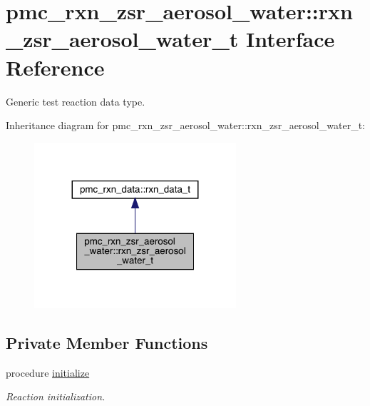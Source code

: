 \hypertarget{structpmc__rxn__zsr__aerosol__water_1_1rxn__zsr__aerosol__water__t}{}\section{pmc\+\_\+rxn\+\_\+zsr\+\_\+aerosol\+\_\+water\+:\+:rxn\+\_\+zsr\+\_\+aerosol\+\_\+water\+\_\+t Interface Reference}
\label{structpmc__rxn__zsr__aerosol__water_1_1rxn__zsr__aerosol__water__t}


Generic test reaction data type.  




Inheritance diagram for pmc\+\_\+rxn\+\_\+zsr\+\_\+aerosol\+\_\+water\+:\+:rxn\+\_\+zsr\+\_\+aerosol\+\_\+water\+\_\+t\+:\nopagebreak
\begin{figure}[H]
\begin{center}
\leavevmode
\includegraphics[width=212pt]{structpmc__rxn__zsr__aerosol__water_1_1rxn__zsr__aerosol__water__t__inherit__graph}
\end{center}
\end{figure}
\subsection*{Private Member Functions}
\begin{DoxyCompactItemize}
\item 
procedure \mbox{\hyperlink{structpmc__rxn__zsr__aerosol__water_1_1rxn__zsr__aerosol__water__t_a2ca87f29fb1714d4280af0e6c91085f1}{initialize}}
\begin{DoxyCompactList}\small\item\em Reaction initialization. \end{DoxyCompactList}\end{DoxyCompactItemize}
